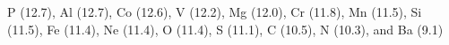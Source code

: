 P (12.7), Al (12.7), Co (12.6), V (12.2), Mg (12.0), Cr (11.8), Mn (11.5), Si (11.5), Fe (11.4), Ne (11.4), O (11.4), S (11.1), C (10.5), N (10.3), and Ba (9.1)%
